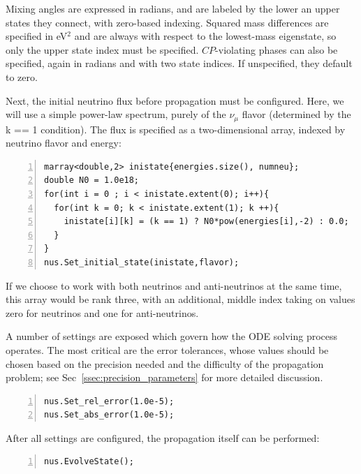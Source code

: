 \documentclass[3p,12pt]{elsarticle}
\newcommand{\ttf}{\ttfamily}
\begin{document}
Mixing angles are expressed in radians, and are labeled by the lower an upper states they connect, with zero-based indexing.
Squared mass differences are specified in eV$^2$ and are always with respect to the lowest-mass eigenstate, so only the upper state index must be specified. 
$CP$-violating phases can also be specified, again in radians and with two state indices. 
If unspecified, they default to zero. 

Next, the initial neutrino flux before propagation must be configured. 
Here, we will use a simple power-law spectrum, purely of the $\nu_\mu$ flavor (determined by the {\ttf k == 1} condition). 
The flux is specified as a two-dimensional array, indexed by neutrino flavor and energy:
\begin{lstlisting}[frame=leftline, numbers = left,breaklines=true,firstnumber=last]
marray<double,2> inistate{energies.size(), numneu};
double N0 = 1.0e18;
for(int i = 0 ; i < inistate.extent(0); i++){
  for(int k = 0; k < inistate.extent(1); k ++){
    inistate[i][k] = (k == 1) ? N0*pow(energies[i],-2) : 0.0;
  }
}
nus.Set_initial_state(inistate,flavor);
\end{lstlisting}
If we choose to work with both neutrinos and anti-neutrinos at the same time, this array would be rank three, with an additional, middle index taking on values zero for neutrinos and one for anti-neutrinos. 

A number of settings are exposed which govern how the ODE solving process operates. 
The most critical are the error tolerances, whose values should be chosen based on the precision needed and the difficulty of the propagation problem; see Sec~\ref{ssec:precision_parameters} for more detailed discussion. 
\begin{lstlisting}[frame=leftline, numbers = left,breaklines=true,firstnumber=last]
nus.Set_rel_error(1.0e-5);
nus.Set_abs_error(1.0e-5);
\end{lstlisting}

After all settings are configured, the propagation itself can be performed:
\begin{lstlisting}[frame=leftline, numbers = left,breaklines=true,firstnumber=last]
nus.EvolveState();
\end{lstlisting}
\end{document}
